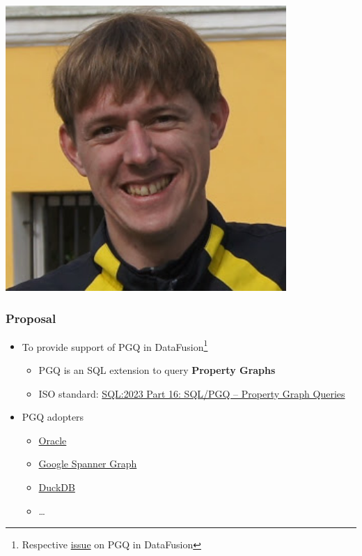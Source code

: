 \documentclass[xcolor=table,aspectratio=169]{beamer}
\begin{document}
\begin{frame}[fragile]
\begin{minipage}[t]{0.24\textwidth}
\begin{center}
\includegraphics[width=0.8\textwidth]{pictures/SemyonGrigorev.jpg}
  \end{center}
\end{minipage}
\end{frame}

\begin{frame}[fragile]
  \frametitle{Proposal}
  \begin{itemize}
    \item To provide support of PGQ in DataFusion\footnote{Respective \href{https://github.com/apache/datafusion/issues/13545}{issue} on PGQ in DataFusion}
    \begin{itemize}
      \item PGQ is an SQL extension to query \textbf{Property Graphs}
      \item ISO standard: \href{https://www.iso.org/standard/79473.html}{SQL:2023 Part 16: SQL/PGQ – Property Graph Queries} 
    \end{itemize} 
    \item PGQ adopters
    \begin{itemize}
      \item \href{https://oracle-base.com/articles/23/sql-property-graphs-and-sql-pgq-23}{Oracle}
      \item \href{https://cloud.google.com/spanner/docs/graph/iso-standards}{Google Spanner Graph}
      \item \href{https://github.com/cwida/duckpgq-extension}{DuckDB}
      \item \ldots
    \end{itemize}
  \end{itemize}
\end{frame}
\end{document}

